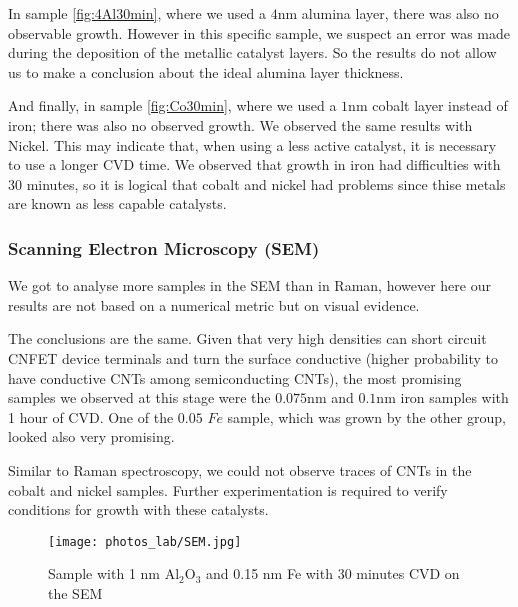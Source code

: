 \documentclass[a4paper,12pt,twoside]{article}
\begin{document}
In sample \ref{fig:4Al30min}, where we used a $4 \mathrm{nm}$ alumina layer, there was also no observable growth. However in this specific sample, we suspect an error was made during the deposition of the metallic catalyst layers. So the results do not allow us to make a conclusion about the ideal alumina layer thickness.

And finally, in sample \ref{fig:Co30min}, where we used a $1 \mathrm{nm}$ cobalt layer instead of iron; there was also no observed growth. We observed the same results with Nickel. This may indicate that, when using a less active catalyst, it is necessary to use a longer CVD time. We observed that growth in iron had difficulties with 30 minutes, so it is logical that cobalt and nickel had problems since thise metals are known as less capable catalysts.

\subsubsection{Scanning Electron Microscopy (SEM)}

We got to analyse more samples in the SEM than in Raman, however here our results are not based on a numerical metric but on visual evidence.

The conclusions are the same. Given that very high densities can short circuit CNFET device terminals and turn the surface conductive (higher probability to have conductive CNTs among semiconducting CNTs), the most promising samples we observed at this stage were the $0.075 \mathrm{nm}$ and $0.1 \mathrm{nm}$ iron samples with 1 hour of CVD. One of the $0.05$ $Fe$ sample, which was grown by the other group, looked also very promising.

Similar to Raman spectroscopy, we could not observe traces of CNTs in the cobalt and nickel samples. Further experimentation is required to verify conditions for growth with these catalysts.

\begin{figure}
    \centering
    \texttt{[image: photos\_lab/SEM.jpg]}
    \caption{Sample with 1 nm Al$_2$O$_3$ and 0.15 nm Fe with 30 minutes CVD on the SEM}
    \label{fig:SEM}
\end{figure}

\newpage
\label{sec:electrode_depo}
\end{document}
